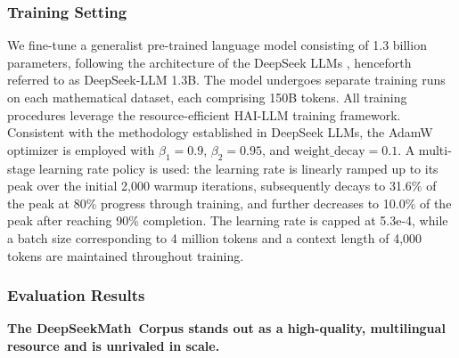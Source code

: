 \subsubsection{Training Setting}
\label{sec:quality-policy}
We fine-tune a generalist pre-trained language model consisting of 1.3 billion parameters, following the architecture of the DeepSeek LLMs \citep{deepseek-llm}, henceforth referred to as DeepSeek-LLM 1.3B. The model undergoes separate training runs on each mathematical dataset, each comprising 150B tokens. All training procedures leverage the resource-efficient HAI-LLM \citep{haillm} training framework. Consistent with the methodology established in DeepSeek LLMs, the AdamW optimizer \citep{adamW} is employed with $\beta_1=0.9$, $\beta_2=0.95$, and $\mathrm{weight\_decay}=0.1$. A multi-stage learning rate policy is used: the learning rate is linearly ramped up to its peak over the initial 2,000 warmup iterations, subsequently decays to 31.6\% of the peak at 80\% progress through training, and further decreases to 10.0\% of the peak after reaching 90\% completion. The learning rate is capped at 5.3e-4, while a batch size corresponding to 4 million tokens and a context length of 4,000 tokens are maintained throughout training.

\subsubsection{Evaluation Results}

\textbf{The DeepSeekMath~Corpus stands out as a high-quality, multilingual resource and is unrivaled in scale.}

